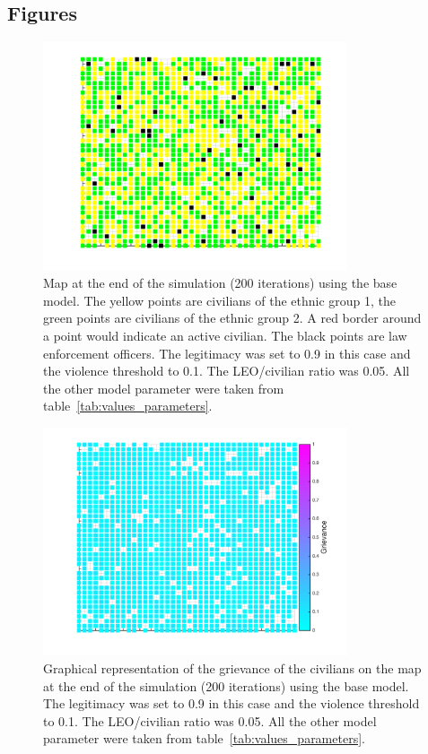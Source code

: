 \documentclass[11pt]{article}
\begin{document}
\subsection{Figures}
\begin{figure}[!htbp]
	\centering
		\includegraphics[width=0.8\textwidth]{../../code/base_model/map_end_L_09.png}
	\caption{Map at the end of the simulation (200 iterations) using the base model. The yellow points are civilians of the ethnic group 1, the green points are civilians of the ethnic group 2. A red border around a point would indicate an active civilian. The black points are law enforcement officers. The legitimacy was set to 0.9 in this case and the violence threshold to 0.1. The LEO/civilian ratio was 0.05. All the other model parameter were taken from table~\ref{tab:values_parameters}.}
	\label{fig:map_end_L_09_base}
\end{figure}
\begin{figure}[!htbp]
	\centering
		\includegraphics[width=0.8\textwidth]{../../code/base_model/grevance_end_L_09.png}
	\caption{Graphical representation of the grievance of the civilians on the map at the end of the simulation (200 iterations) using the base model. The legitimacy was set to 0.9 in this case and the violence threshold to 0.1. The LEO/civilian ratio was 0.05. All the other model parameter were taken from table~\ref{tab:values_parameters}.}
	\label{fig:griev_end_L_09_base}
\end{figure}
\end{document}
